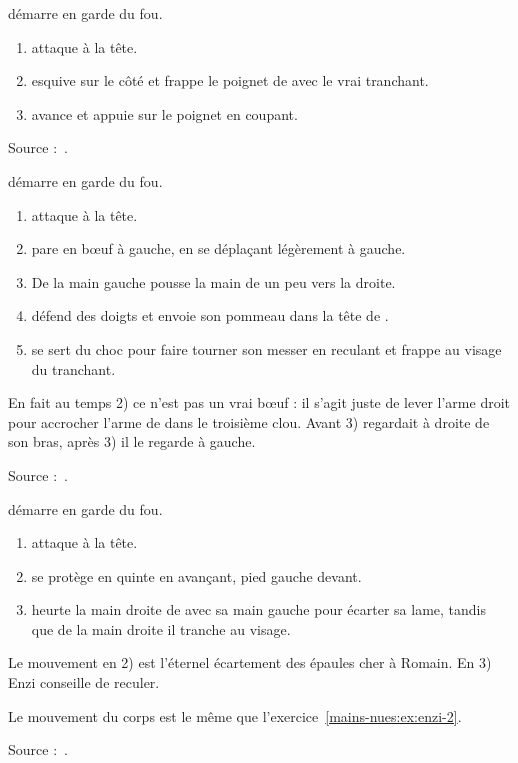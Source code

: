\begin{technique}

\D démarre en garde du fou.

\begin{enumerate}
	\item \A attaque à la tête.
	\item \D esquive sur le côté et frappe le poignet de \A avec le vrai tranchant.
	\item \D avance et appuie sur le poignet en coupant.
\end{enumerate}

Source :~\cite{enzi:dijon:messer_inner:2015}.

\end{technique}


\begin{technique}

\D démarre en garde du fou.

\begin{enumerate}
	\item \A attaque à la tête.
	\item \D pare en bœuf à gauche, en se déplaçant légèrement à gauche.
	\item De la main gauche \D pousse la main de \A un peu vers la droite.
	\item \D défend des doigts et envoie son pommeau dans la tête de \A.
	\item \D se sert du choc pour faire tourner son messer en reculant et frappe \A au visage du tranchant.
\end{enumerate}

En fait au temps 2) ce n'est pas un vrai bœuf : il s'agit juste de lever l'arme droit pour accrocher l'arme de \A dans le troisième clou.
Avant 3) \D regardait \A à droite de son bras, après 3) il le regarde à gauche.

Source :~\cite{enzi:dijon:messer_inner:2015}.

\end{technique}


\begin{technique}

\D démarre en garde du fou.

\begin{enumerate}
	\item \A attaque à la tête.
	\item \D se protège en quinte en avançant, pied gauche devant.
	\item \D heurte la main droite de \A avec sa main gauche pour écarter sa lame, tandis que de la main droite il tranche au visage.
\end{enumerate}

Le mouvement en 2) est l'éternel écartement des épaules cher à Romain.
En 3) Enzi conseille de reculer.

Le mouvement du corps est le même que l'exercice~\ref{mains-nues:ex:enzi-2}.

Source :~\cite{enzi:dijon:messer_inner:2015}.

\end{technique}


